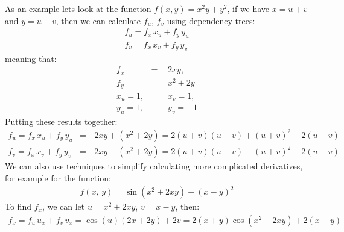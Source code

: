 \documentclass[letterpaper,10pt,english]{jupyterBook}
\begin{document}
\sphinxAtStartPar
As an example lets look at the function \(f(x,y)=x^2 y+y^2\), if we have \(x = u+v\) and \(y = u-v\), then we can calculate \(f_u,\, f_v\) using dependency trees:
\begin{equation*}
\begin{split}f_u = f_x\, x_u + f_y\, y_u\\
f_v = f_x\, x_v + f_y\, y_v\end{split}
\end{equation*}
\sphinxAtStartPar
meaning that:
\begin{equation*}
\begin{split}f_x &=&\, 2xy, \\
f_y &=&\, x^2+2y \\
x_u=1, &\quad&\, x_v=1, \\
y_u=1, &\quad&\, y_v=-1\end{split}
\end{equation*}
\sphinxAtStartPar
Putting these results together:
\begin{equation*}
\begin{split}f_u = f_x\, x_u + f_y\, y_u &=&\, 2xy+(x^2+2y) = 2(u+v)(u-v)+(u+v)^2+2(u-v)\\
f_v = f_x\, x_v + f_y\, y_v &=&\, 2xy-(x^2+2y) = 2(u+v)(u-v)-(u+v)^2-2(u-v)\end{split}
\end{equation*}
\sphinxAtStartPar
We can also use techniques to simplify calculating more complicated derivatives, for example for the function:
\begin{equation*}
\begin{split}f(x,\, y) = \sin\left(x^2+2xy\right)+(x-y)^2\end{split}
\end{equation*}
\sphinxAtStartPar
To find \(f_x\), we can let \(u = x^2 + 2xy\), \(v = x-y\), then:
\begin{equation*}
\begin{split}f_x = f_u\, u_x +f_v\, v_x = \cos(u)(2x+2y)+2v = 2(x+y)\cos(x^2+2xy) + 2(x-y)\end{split}
\end{equation*}
\end{document}
